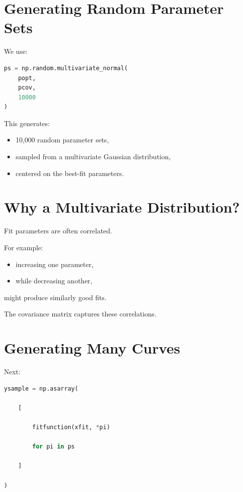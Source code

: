 \documentclass[11pt]{article}
\begin{document}
\section{Generating Random Parameter Sets}

We use:

\begin{lstlisting}[language=Python]
ps = np.random.multivariate_normal(
    popt,
    pcov,
    10000
)
\end{lstlisting}

This generates:

\begin{itemize}
    \item 10,000 random parameter sets,
    \item sampled from a multivariate Gaussian distribution,
    \item centered on the best-fit parameters.
\end{itemize}

\section{Why a Multivariate Distribution?}

Fit parameters are often correlated.

For example:

\begin{itemize}
    \item increasing one parameter,
    \item while decreasing another,
\end{itemize}

might produce similarly good fits.

The covariance matrix captures these correlations.

\section{Generating Many Curves}

Next:

\begin{lstlisting}[language=Python]
ysample = np.asarray(

    [

        fitfunction(xfit, *pi)

        for pi in ps

    ]

)
\end{lstlisting}
\end{document}
